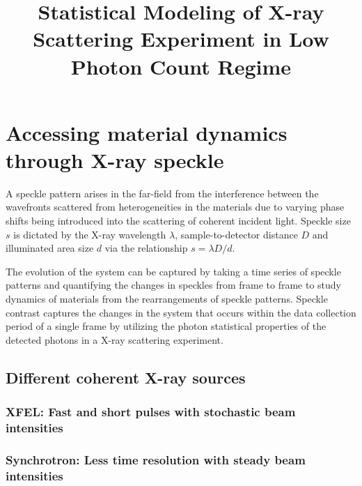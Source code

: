 \documentclass[11pt]{article}
\theoremstyle{definition}
\begin{document}


\title{\LARGE {\textbf{Statistical Modeling of X-ray Scattering Experiment in Low Photon Count Regime}}}
\maketitle
\newpage
\section{Accessing material dynamics through X-ray speckle}
A speckle pattern arises in the far-field from the interference between the wavefronts scattered from heterogeneities in the materials due to varying phase shifts being introduced into the scattering of coherent incident light. Speckle size \(s\) is dictated by the X-ray wavelength \(\lambda\), sample-to-detector distance \(D\) and illuminated area size \(d\) via the relationship \(s = \lambda D/d \). 

The evolution of the system can be captured by taking a time series of speckle patterns and quantifying the changes in speckles from frame to frame to study dynamics of materials from the rearrangements of speckle patterns. Speckle contrast captures the changes in the system that occurs within the data collection period of a single frame by utilizing the photon statistical properties of the detected photons in a X-ray scattering experiment. 

\subsection{Different coherent X-ray sources}
\subsubsection{XFEL: Fast and short pulses with stochastic beam intensities}
\subsubsection{Synchrotron: Less time resolution with steady beam intensities}
\end{document}
